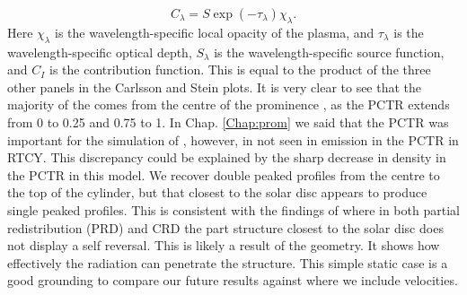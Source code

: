 \begin{equation}
    C_\lambda=S\exp\left(-\tau_\lambda\right)\chi_\lambda.
\end{equation}
Here $\chi_\lambda$ is the wavelength-specific local opacity of the plasma, and $\tau_\lambda$ is the wavelength-specific optical depth, $S_\lambda$ is the wavelength-specific source function, and $C_I$ is the contribution function. This is equal to the product of the three other panels in the Carlsson and Stein plots. It is very clear to see that the majority of the \mgiihk{} comes from the centre of the prominence , as the PCTR extends from 0 to 0.25 and 0.75 to 1. In Chap. \ref{Chap:prom} we said that the PCTR was important for the simulation of \mgiihk{}, however, \mgiihk{} in not seen in emission in the PCTR in RTCY. This discrepancy could be explained by the sharp decrease in density in the PCTR in this model. We recover double peaked profiles from the centre to the top of the cylinder, but that closest to the solar disc appears to produce single peaked profiles. This is consistent with the findings of \cite{paletou_two-dimensional_1993} where in both partial redistribution (PRD) and CRD the part structure closest to the solar disc does not display a self reversal. This is likely a result of the geometry. It shows how effectively the radiation can penetrate the structure. This simple static case is a good grounding to compare our future results against where we include velocities.
